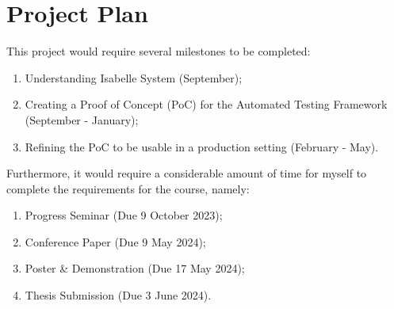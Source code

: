\section{Project Plan}

This project would require several milestones to be completed:
\begin{enumerate}
    \item Understanding Isabelle System (September);
    \item Creating a Proof of Concept (PoC) for the Automated Testing Framework (September - January);
    \item Refining the PoC to be usable in a production setting (February - May).
\end{enumerate}

Furthermore, it would require a considerable amount of time for myself to complete the requirements for the course, namely:
\begin{enumerate}
    \item Progress Seminar (Due 9 October 2023);
    \item Conference Paper (Due 9 May 2024);
    \item Poster \& Demonstration (Due 17 May 2024);
    \item Thesis Submission (Due 3 June 2024).
\end{enumerate}






